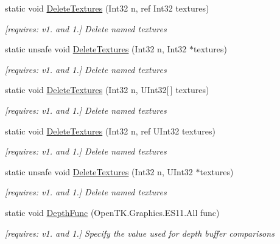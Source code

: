\begin{DoxyCompactItemize}
static void \hyperlink{class_open_t_k_1_1_graphics_1_1_e_s11_1_1_g_l_af28e6463de7aeaba462e29109adbf96e}{Delete\-Textures} (Int32 n, ref Int32 textures)
\begin{DoxyCompactList}\small\item\em \mbox{[}requires\-: v1. and 1.\mbox{]} Delete named textures \end{DoxyCompactList}\item 
static unsafe void \hyperlink{class_open_t_k_1_1_graphics_1_1_e_s11_1_1_g_l_a86bcef5879d200a3be48521e7864f344}{Delete\-Textures} (Int32 n, Int32 $\ast$textures)
\begin{DoxyCompactList}\small\item\em \mbox{[}requires\-: v1. and 1.\mbox{]} Delete named textures \end{DoxyCompactList}\item 
static void \hyperlink{class_open_t_k_1_1_graphics_1_1_e_s11_1_1_g_l_a6ad20d4e499ceb53fdaebe658d420fda}{Delete\-Textures} (Int32 n, U\-Int32\mbox{[}$\,$\mbox{]} textures)
\begin{DoxyCompactList}\small\item\em \mbox{[}requires\-: v1. and 1.\mbox{]} Delete named textures \end{DoxyCompactList}\item 
static void \hyperlink{class_open_t_k_1_1_graphics_1_1_e_s11_1_1_g_l_aa564bd87644b01703ab07000b1978020}{Delete\-Textures} (Int32 n, ref U\-Int32 textures)
\begin{DoxyCompactList}\small\item\em \mbox{[}requires\-: v1. and 1.\mbox{]} Delete named textures \end{DoxyCompactList}\item 
static unsafe void \hyperlink{class_open_t_k_1_1_graphics_1_1_e_s11_1_1_g_l_acb809657059417e33d0d3980bed8d609}{Delete\-Textures} (Int32 n, U\-Int32 $\ast$textures)
\begin{DoxyCompactList}\small\item\em \mbox{[}requires\-: v1. and 1.\mbox{]} Delete named textures \end{DoxyCompactList}\item 
static void \hyperlink{class_open_t_k_1_1_graphics_1_1_e_s11_1_1_g_l_aaeef14cdd8e11fd6a182d0da54cc80b9}{Depth\-Func} (Open\-T\-K.\-Graphics.\-E\-S11.\-All func)
\begin{DoxyCompactList}\small\item\em \mbox{[}requires\-: v1. and 1.\mbox{]} Specify the value used for depth buffer comparisons \end{DoxyCompactList}\item 

\end{DoxyCompactItemize}
